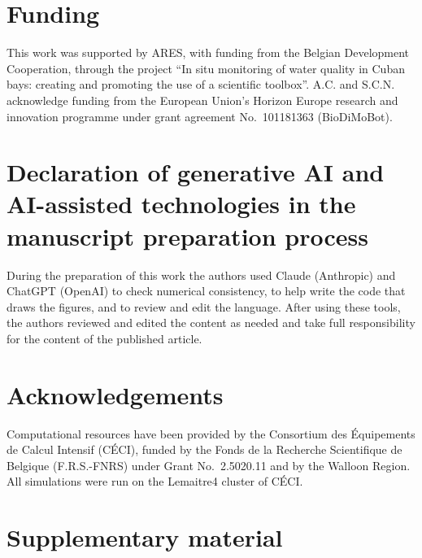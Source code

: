 \documentclass[a4paper,fleqn]{ems-dc}
\begin{document}
\section*{Funding}
This work was supported by ARES, with funding from the Belgian Development Cooperation,
through the project ``In situ monitoring of water quality in Cuban bays: creating and
promoting the use of a scientific toolbox''. A.C. and S.C.N. acknowledge funding from the
European Union's Horizon Europe research and innovation programme under grant agreement
No.~101181363 (BioDiMoBot).

\section*{Declaration of generative AI and AI-assisted technologies in the manuscript
preparation process}
During the preparation of this work the authors used Claude (Anthropic) and ChatGPT
(OpenAI) to check numerical consistency, to help write the code that draws the figures, and
to review and edit the language. After using these tools, the authors reviewed and edited
the content as needed and take full responsibility for the content of the published
article.

\section*{Acknowledgements}
Computational resources have been provided by the Consortium des \'Equipements de Calcul
Intensif (C\'ECI), \linebreak[1] funded by the Fonds de la Recherche Scientifique de Belgique
(F.R.S.-FNRS) under Grant No.\ 2.5020.11 and by the Walloon Region. All simulations
were run on the Lemaitre4 cluster of C\'ECI.

\printcredits




\clearpage
\onecolumn
\section*{Supplementary material}
\setcounter{figure}{0}
\renewcommand{\thefigure}{S\arabic{figure}}
\renewcommand{\theHfigure}{S\arabic{figure}}
\setcounter{table}{0}
\renewcommand{\thetable}{S\arabic{table}}
\renewcommand{\theHtable}{S\arabic{table}}
\end{document}
